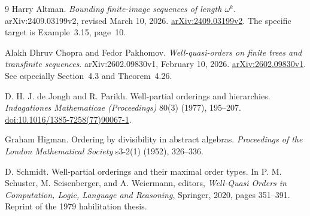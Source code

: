 \documentclass[11pt,letterpaper]{article}
\theoremstyle{definition}
\theoremstyle{remark}
\begin{document}
\begin{thebibliography}{9}
Harry Altman.
\emph{Bounding finite-image sequences of length $\omega^k$}.
arXiv:2409.03199v2, revised March 10, 2026.
\href{https://arxiv.org/abs/2409.03199v2}{arXiv:2409.03199v2}.
The specific target is Example~3.15, page~10.

Alakh Dhruv Chopra and Fedor Pakhomov.
\emph{Well-quasi-orders on finite trees and transfinite sequences}.
arXiv:2602.09830v1, February 10, 2026.
\href{https://arxiv.org/abs/2602.09830v1}{arXiv:2602.09830v1}.
See especially Section~4.3 and Theorem~4.26.

D. H. J. de Jongh and R. Parikh.
Well-partial orderings and hierarchies.
\emph{Indagationes Mathematicae (Proceedings)} 80(3) (1977), 195--207.
\href{https://doi.org/10.1016/1385-7258(77)90067-1}
{doi:10.1016/1385-7258(77)90067-1}.

Graham Higman.
Ordering by divisibility in abstract algebras.
\emph{Proceedings of the London Mathematical Society} s3-2(1) (1952), 326--336.

D. Schmidt.
Well-partial orderings and their maximal order types.
In P. M. Schuster, M. Seisenberger, and A. Weiermann, editors,
\emph{Well-Quasi Orders in Computation, Logic, Language and Reasoning},
Springer, 2020, pages 351--391. Reprint of the 1979 habilitation thesis.
\end{thebibliography}
\end{document}
